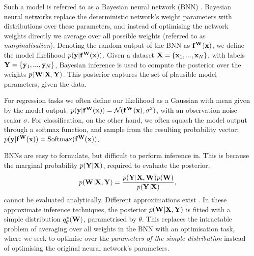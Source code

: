 Such a model is referred to as a Bayesian neural network (BNN) \citep{ denker1991transforming, mackay1992practical, neal1995bayesian}. 
Bayesian neural networks replace the deterministic network's weight parameters with distributions over these parameters, and instead of optimising the network weights directly we average over all possible weights (referred to as \textit{marginalisation}). 
Denoting the random output of the BNN as $\mathbf{f}^{\mathbf{W}}(\mathbf{x})$, we define the model likelihood $p(\mathbf{y} | \mathbf{f}^{\mathbf{W}}(\mathbf{x}))$.
Given a dataset $\mathbf{X}=\{\mathbf{x}_1, ..., \mathbf{x}_N\}$, with labels $\mathbf{Y}=\{\mathbf{y}_1, ..., \mathbf{y}_N\}$, Bayesian inference is used to compute the posterior over the weights $p(\mathbf{W} | \mathbf{X}, \mathbf{Y})$. This posterior captures the set of plausible model parameters, given the data.

For regression tasks we often define our likelihood as a Gaussian with mean given by the model output:
$
p(\mathbf{y} | \mathbf{f}^{\mathbf{W}}(\mathbf{x})) = \mathcal{N}(\mathbf{f}^{\mathbf{W}}(\mathbf{x}), \sigma^2)
$,
with an observation noise scalar $\sigma$. 
For classification, on the other hand, we often squash the model output through a softmax function, and sample from the resulting probability vector:
$
p(\mathbf{y} | \mathbf{f}^{\mathbf{W}}(\mathbf{x})) = \text{Softmax}(\mathbf{f}^{\mathbf{W}}(\mathbf{x}))
$.

BNNs are easy to formulate, but difficult to perform inference in. This is because the marginal probability $p(\mathbf{Y} | \mathbf{X})$, required to evaluate the posterior,
\begin{equation}  
p(\mathbf{W} | \mathbf{X}, \mathbf{Y}) = \frac{p(\mathbf{Y} | \mathbf{X}, \mathbf{W})p(\mathbf{W})}{p(\mathbf{Y} | \mathbf{X})},
\end{equation}  
cannot be evaluated analytically. Different approximations exist \citep{graves2011practical, blundell2015weight, hernandez2016black, Gal2016Bayesian}.
In these approximate inference techniques, the posterior $p(\mathbf{W} | \mathbf{X}, \mathbf{Y})$ is fitted with a simple distribution $q_\theta^*(\mathbf{W})$, parametrised by $\theta$. This replaces the intractable problem of averaging over all weights in the BNN with an optimisation task, where we seek to optimise over the \textit{parameters of the simple distribution} instead of optimising the original neural network's parameters.

